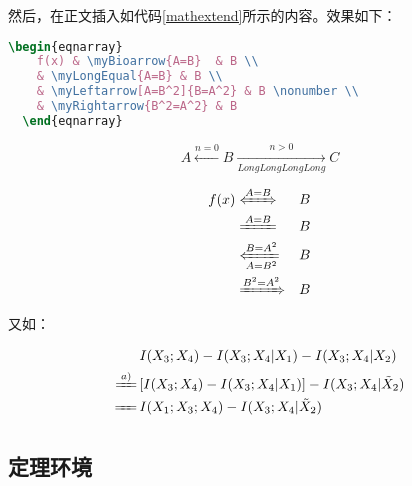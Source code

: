 然后，在正文插入如代码\ref{mathextend}所示的内容。效果如下：

\begin{lstlisting}[language={TeX}, caption={可伸长的符号},label=mathextend,float]
  \begin{eqnarray}
    f(x) & \myBioarrow{A=B}  & B \\
    & \myLongEqual{A=B} & B \\
    & \myLeftarrow[A=B^2]{B=A^2} & B \nonumber \\
    & \myRightarrow{B^2=A^2} & B
  \end{eqnarray}
\end{lstlisting}

\begin{displaymath}
    A \xleftarrow{n=0} B \xrightarrow[LongLongLongLong]{n>0} C 
\end{displaymath}

\begin{eqnarray}
  f(x) & \myBioarrow{A=B}  & B \\
  & \myLongEqual{A=B} & B \\
  & \myLeftarrow[A=B^2]{B=A^2} & B \nonumber \\
  & \myRightarrow{B^2=A^2} & B
\end{eqnarray}

又如：

\begin{align}
  \label{eq:none}
  & I(X_3;X_4)-I(X_3;X_4|X_1)-I(X_3;X_4|X_2) \nonumber \\
  \myLongEqual{a)}\, & [I(X_3;X_4)-I(X_3;X_4|X_1)]-I(X_3;X_4|\tilde{X}_2) \\
  \myLongEqual[\rule{0.28cm}{0cm}]{}\, & I(X_1;X_3;X_4)-I(X_3;X_4|\tilde{X}_2)
\end{align}


\subsection{定理环境}

